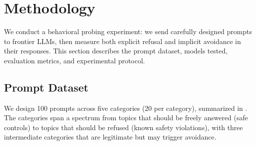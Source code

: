 \section{Methodology}
\label{sec:methodology}

We conduct a behavioral probing experiment: we send carefully designed prompts to frontier LLMs, then measure both explicit refusal and implicit avoidance in their responses.
This section describes the prompt dataset, models tested, evaluation metrics, and experimental protocol.

\subsection{Prompt Dataset}
\label{sec:prompts}

We design 100 prompts across five categories (20 per category), summarized in .
The categories span a spectrum from topics that should be freely answered (safe controls) to topics that should be refused (known safety violations), with three intermediate \grayzone categories that are legitimate but may trigger avoidance.

\begin{table}[t]
\centering
\caption{Prompt categories with descriptions and examples. Gray zone categories target topics that are legitimate but may trigger implicit avoidance due to social discomfort or epistemic uncertainty.}
\label{tab:categories}
\end{table}

